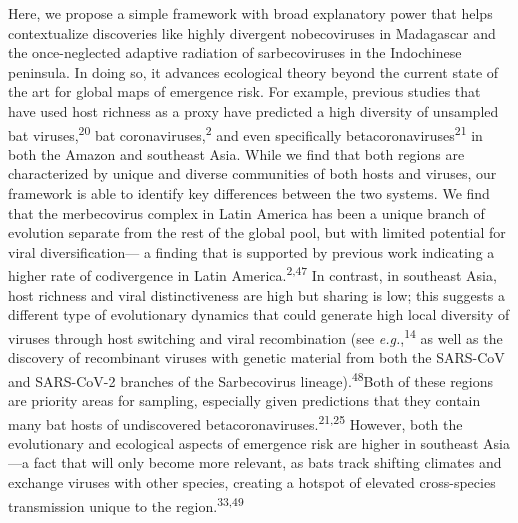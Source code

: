\documentclass[10pt,oneside]{article}
\begin{document}
Here, we propose a simple framework with broad explanatory power that
helps contextualize discoveries like highly divergent nobecoviruses in
Madagascar and the once-neglected adaptive radiation of sarbecoviruses
in the Indochinese peninsula. In doing so, it advances ecological theory
beyond the current state of the art for global maps of emergence risk.
For example, previous studies that have used host richness as a proxy
have predicted a high diversity of unsampled bat
viruses,\textsuperscript{20} bat coronaviruses,\textsuperscript{2} and
even specifically betacoronaviruses\textsuperscript{21} in both the
Amazon and southeast Asia. While we find that both regions are
characterized by unique and diverse communities of both hosts and
viruses, our framework is able to identify key differences between the
two systems. We find that the merbecovirus complex in Latin America has
been a unique branch of evolution separate from the rest of the global
pool, but with limited potential for viral diversification--- a finding
that is supported by previous work indicating a higher rate of
codivergence in Latin America.\textsuperscript{2,47} In contrast, in
southeast Asia, host richness and viral distinctiveness are high but
sharing is low; this suggests a different type of evolutionary dynamics
that could generate high local diversity of viruses through host
switching and viral recombination (see \emph{e.g.},\textsuperscript{14}
as well as the discovery of recombinant viruses with genetic material
from both the SARS-CoV and SARS-CoV-2 branches of the Sarbecovirus
lineage).\textsuperscript{48}Both of these regions are priority areas
for sampling, especially given predictions that they contain many bat
hosts of undiscovered betacoronaviruses.\textsuperscript{21,25} However,
both the evolutionary and ecological aspects of emergence risk are
higher in southeast Asia---a fact that will only become more relevant,
as bats track shifting climates and exchange viruses with other species,
creating a hotspot of elevated cross-species transmission unique to the
region.\textsuperscript{33,49}
\end{document}
